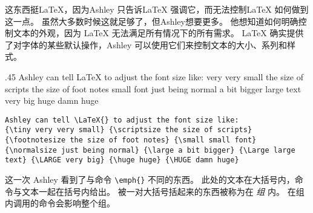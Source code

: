 这东西挺\LaTeX，因为Ashley 只告诉\LaTeX{} 强调它，而无法控制\LaTeX{} 如何做到这一点。 虽然大多数时候这就足够了，但Ashley想要更多。 他想知道如何明确控制文本的外观，因为 \LaTeX{} 无法满足所有情况下的所有需求。 \LaTeX{} 确实提供了对字体的某些默认操作，Ashley 可以使用它们来控制文本的大小、系列和样式。
\begin{parexammar}{.45\textandmarginlen}{
Ashley can tell \LaTeX{} to adjust the font size like:
{\tiny very very small} {\scriptsize the size of scripts} {\footnotesize the size of foot notes} {\small small font} {\normalsize just being normal} {\large a bit bigger} {\Large large text} {\LARGE very big} {\huge huge} {\Huge damn huge}
}
\begin{lstlisting}
Ashley can tell \LaTeX{} to adjust the font size like:
{\tiny very very small} {\scriptsize the size of scripts} {\footnotesize the size of foot notes} {\small small font} {\normalsize just being normal} {\large a bit bigger} {\Large large text} {\LARGE very big} {\huge huge} {\HUGE damn huge}
\end{lstlisting}
\end{parexammar}
这一次 Ashley 看到了与命令 \verb=\emph{}= 不同的东西。 此处的文本在大括号内，命令与文本一起在括号内给出。 被一对大括号括起来的东西被称为在 \emph{组} 内。 在组内调用的命令会影响整个组。

